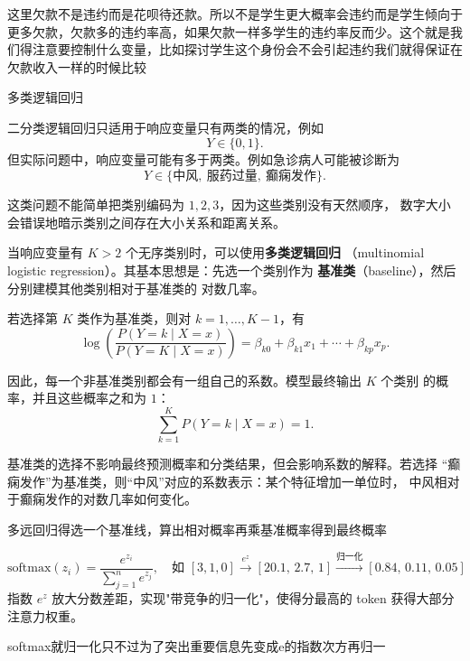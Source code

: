 \begin{dxtips}
    这里欠款不是违约而是花呗待还款。所以不是学生更大概率会违约而是学生倾向于更多欠款，欠款多的违约率高，如果欠款一样多学生的违约率反而少。这个就是我们得注意要控制什么变量，比如探讨学生这个身份会不会引起违约我们就得保证在欠款收入一样的时候比较
\end{dxtips}
\begin{note}{多类逻辑回归}

二分类逻辑回归只适用于响应变量只有两类的情况，例如
\[
Y \in \{0,1\}.
\]
但实际问题中，响应变量可能有多于两类。例如急诊病人可能被诊断为
\[
Y \in \{\text{中风},\ \text{服药过量},\ \text{癫痫发作}\}.
\]

这类问题不能简单把类别编码为 \(1,2,3\)，因为这些类别没有天然顺序，
数字大小会错误地暗示类别之间存在大小关系和距离关系。

当响应变量有 \(K>2\) 个无序类别时，可以使用\textbf{多类逻辑回归}
（multinomial logistic regression）。其基本思想是：先选一个类别作为
\textbf{基准类}（baseline），然后分别建模其他类别相对于基准类的
对数几率。

若选择第 \(K\) 类作为基准类，则对 \(k=1,\ldots,K-1\)，有
\[
\log\left(
\frac{P(Y=k\mid X=x)}{P(Y=K\mid X=x)}
\right)
=
\beta_{k0}+\beta_{k1}x_1+\cdots+\beta_{kp}x_p.
\]

因此，每一个非基准类别都会有一组自己的系数。模型最终输出 \(K\) 个类别
的概率，并且这些概率之和为 \(1\)：
\[
\sum_{k=1}^{K}P(Y=k\mid X=x)=1.
\]

基准类的选择不影响最终预测概率和分类结果，但会影响系数的解释。若选择
“癫痫发作”为基准类，则“中风”对应的系数表示：某个特征增加一单位时，
中风相对于癫痫发作的对数几率如何变化。

\end{note}
\begin{dxtips}
    多远回归得选一个基准线，算出相对概率再乘基准概率得到最终概率
\end{dxtips}
\begin{definition}[Softmax]
\[
\mathrm{softmax}(z_i) = \frac{e^{z_i}}{\sum_{j=1}^{n} e^{z_j}},\quad
\text{如 } [3,1,0] \xrightarrow{e^z} [20.1,\,2.7,\,1] \xrightarrow{\text{归一化}} [0.84,\,0.11,\,0.05]
\]
指数 $e^z$ 放大分数差距，实现"带竞争的归一化"，使得分最高的 token 获得大部分注意力权重。
\end{definition}
\begin{dxtips}
    softmax就归一化只不过为了突出重要信息先变成e的指数次方再归一
\end{dxtips}
